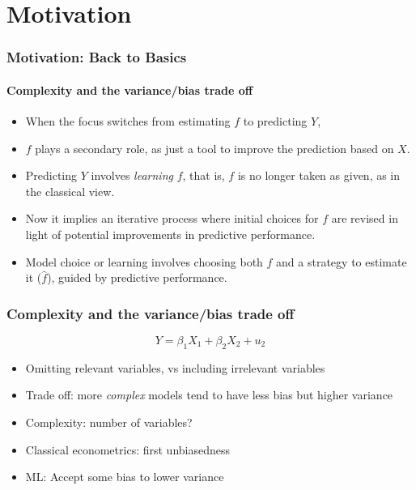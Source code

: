\documentclass[
  shownotes,
  xcolor={svgnames},
  hyperref={colorlinks,citecolor=DarkBlue,linkcolor=DarkRed,urlcolor=DarkBlue}
  ]{beamer}
\begin{document}
\section{Motivation }
\begin{frame}[fragile]
\frametitle{Motivation: Back to Basics}
\framesubtitle{Complexity and the variance/bias trade off}

\begin{itemize}

  \item When the focus switches from estimating $f$ to predicting $Y$, 
  \medskip
  \item $f$ plays a secondary role, as just a tool to improve the prediction based on $X$.
  \medskip
  \item  Predicting $Y$ involves \emph{learning} $f$, that is, $f$ is no longer taken as given, as in the classical view. 
  \medskip
  \item Now it implies an iterative process where initial choices for $f$ are revised in light of potential improvements in predictive performance.
  \medskip
  \item Model choice or learning involves choosing both $f$ and a strategy to estimate it ($\hat f$), guided by predictive performance. 

\end{itemize}


\end{frame}

\begin{frame}
\frametitle{Complexity and the variance/bias trade off}



\begin{equation}
Y=\beta_1 X_1 + \beta_2 X_2 + u_2
\end{equation}

\bigskip
\begin{itemize}
  \item Omitting relevant variables, vs including irrelevant variables
  \item Trade off: more {\it complex} models tend to have less bias but higher variance
  \item Complexity: number of variables?
  \item Classical econometrics: first unbiasedness
  \item ML: Accept some bias to lower variance
\end{itemize}

\end{frame}
\end{document}
